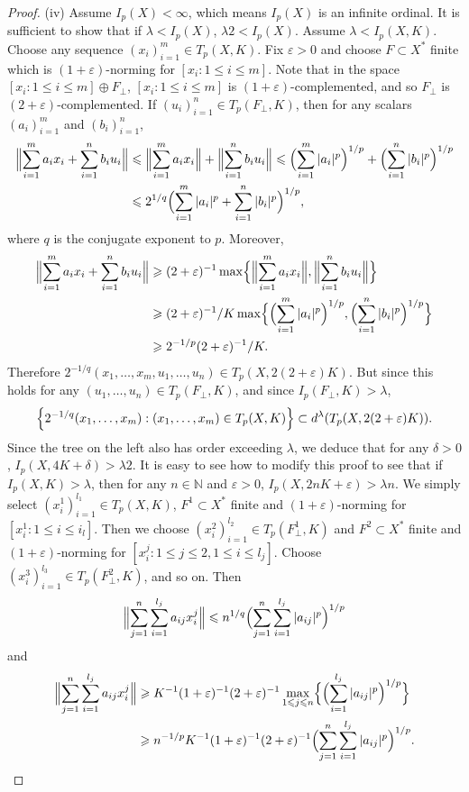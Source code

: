\documentclass[12pt]{amsart}
\theoremstyle{definition}
\newcommand{\nn}{\mathbb{N}}
\begin{document}
\begin{proof}
(iv) Assume $I_p(X)<\infty$, which means $I_p(X)$ is an infinite ordinal.  It is sufficient to show that if $\lambda<I_p(X)$, $\lambda 2<I_p(X)$. Assume $\lambda<I_p(X,K)$.  Choose any sequence $(x_i)_{i=1}^m\in T_p(X, K)$.  Fix $\varepsilon>0$ and choose $F\subset X^*$ finite which is $(1+\varepsilon)$-norming for $[x_i:1\leqslant i\leqslant m]$. Note that in the space $[x_i:1\leqslant i\leqslant m]\oplus F_\perp$, $[x_i:1\leqslant i\leqslant m]$ is $(1+\varepsilon)$-complemented, and so $F_\perp$ is $(2+\varepsilon)$-complemented.  If $(u_i)_{i=1}^n\in T_p(F_\perp, K)$, then for any scalars $(a_i)_{i=1}^m$ and $(b_i)_{i=1}^n$, \begin{align*} \Bigl\|\sum_{i=1}^m a_i x_i +\sum_{i=1}^n b_iu_i\Bigr\| & \leqslant \Bigl\|\sum_{i=1}^m a_ix_i\Bigr\|+\Bigl\|\sum_{i=1}^n b_iu_i\Bigr\| \leqslant \Bigl(\sum_{i=1}^m |a_i|^p\Bigr)^{1/p}+\Bigl(\sum_{i=1}^n |b_i|^p\Bigr)^{1/p} \\ & \leqslant 2^{1/q}\Bigl(\sum_{i=1}^m |a_i|^p+\sum_{i=1}^n |b_i|^p\Bigr)^{1/p}, \end{align*} where $q$ is the conjugate exponent to $p$.  Moreover, \begin{align*} \Bigl\|\sum_{i=1}^m a_i x_i +\sum_{i=1}^n b_iu_i\Bigr\| & \geqslant (2+\varepsilon)^{-1}\max\Bigl\{\Bigl\|\sum_{i=1}^m a_ix_i\Bigr\|, \Bigl\|\sum_{i=1}^n b_iu_i\Bigr\|\Bigr\} \\ & \geqslant (2+\varepsilon)^{-1}/K \max\Bigl\{\Bigl(\sum_{i=1}^m |a_i|^p\Bigr)^{1/p}, \Bigl(\sum_{i=1}^n|b_i|^p\Bigr)^{1/p}\Bigr\} \\ & \geqslant 2^{-1/p}(2+\varepsilon)^{-1}/K.\end{align*} Therefore $2^{-1/q}(x_1, \ldots, x_m, u_1, \ldots, u_n)\in T_p(X,2(2+\varepsilon)K)$.  But since this holds for any $(u_1, \ldots, u_n)\in T_p(F_\perp, K)$, and since $I_p(F_\perp, K)>\lambda$, $$\Bigl\{2^{-1/q}(x_1, \ldots, x_m): (x_1, \ldots, x_m)\in T_p(X, K)\Bigr\}\subset d^\lambda(T_p(X, 2(2+\varepsilon)K)).$$  Since the tree on the left also has order exceeding $\lambda$, we deduce that for any $\delta>0$, $I_p(X, 4K+\delta)>\lambda 2$.  
It is easy to see how to modify this proof to see that if $I_p(X, K)>\lambda$, then for any $n\in \nn$ and $\varepsilon>0$, $I_p(X, 2nK+\varepsilon)>\lambda n$.  We simply select $(x^1_i)_{i=1}^{l_1}\in T_p(X, K)$, $F^1\subset X^*$ finite and $(1+\varepsilon)$-norming for $[x_i^1:1\leqslant i\leqslant i_l]$.  Then we choose $(x^2_i)_{i=1}^{l_2}\in T_p(F^1_\perp, K)$ and $F^2\subset X^*$ finite and $(1+\varepsilon)$-norming for $[x_i^j: 1\leqslant j\leqslant 2, 1\leqslant i\leqslant l_j]$.  Choose $(x^3_i)_{i=1}^{l_3}\in T_p(F^2_\perp, K)$, and so on.  Then $$\Bigl\|\sum_{j=1}^n \sum_{i=1}^{l_j} a_{ij}x^j_i\Bigr\|\leqslant n^{1/q}\Bigl(\sum_{j=1}^n\sum_{i=1}^{l_j}|a_{ij}|^p\Bigr)^{1/p}$$ and \begin{align*} \Bigl\|\sum_{j=1}^n\sum_{i=1}^{l_j} a_{ij} x^j_i\Bigr\| & \geqslant K^{-1}(1+\varepsilon)^{-1}(2+\varepsilon)^{-1}\max_{1\leqslant j\leqslant n}\Bigl\{\Bigl(\sum_{i=1}^{l_j}|a_{ij}|^p\Bigr)^{1/p}\Bigr\} \\ & \geqslant n^{-1/p}K^{-1}(1+\varepsilon)^{-1}(2+\varepsilon)^{-1}\Bigl(\sum_{j=1}^n \sum_{i=1}^{l_j} |a_{ij}|^p\Bigr)^{1/p}.\end{align*}


\end{proof}
\end{document}
